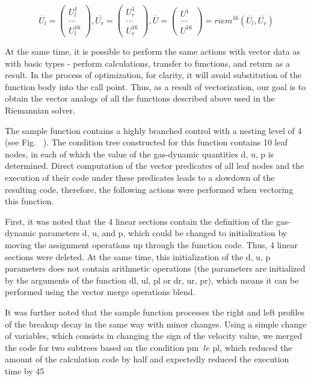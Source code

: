 \documentclass[
11pt,%
tightenlines,%
twoside,%
onecolumn,%
nofloats,%
nobibnotes,%
nofootinbib,%
superscriptaddress,%
noshowpacs,%
centertags]%
{revtex4}
\begin{document}
\begin{equation}\label{eq:riemann_16}
\overline{U_l} = \left( \begin{array}{ccc} U_l^1 \\ ... \\ U_l^{16} \end{array} \right),
\overline{U_r} = \left( \begin{array}{ccc} U_r^1 \\ ... \\ U_r^{16} \end{array} \right),
\overline{U} = \left( \begin{array}{ccc} U^1 \\ ... \\ U^{16} \end{array} \right) = riem^{16}(\overline{U_l}, \overline{U_r})
\end{equation}

At the same time, it is possible to perform the same actions with vector data as with basic types - perform calculations, transfer to functions, and return as a result. In the process of optimization, for clarity, it will avoid substitution of the function body into the call point. Thus, as a result of vectorization, our goal is to obtain the vector analogs of all the functions described above used in the Riemannian solver.

The sample function contains a highly branched control with a nesting level of 4 (see Fig. ~). The condition tree constructed for this function contains 10 leaf nodes, in each of which the value of the gas-dynamic quantities d, u, p is determined. Direct computation of the vector predicates of all leaf nodes and the execution of their code under these predicates leads to a slowdown of the resulting code, therefore, the following actions were performed when vectoring this function.

First, it was noted that the 4 linear sections contain the definition of the gas-dynamic parameters d, u, and p, which could be changed to initialization by moving the assignment operations up through the function code. Thus, 4 linear sections were deleted. At the same time, this initialization of the d, u, p parameters does not contain arithmetic operations (the parameters are initialized by the arguments of the function dl, ul, pl or dr, ur, pr), which means it can be performed using the vector merge operations blend.

It was further noted that the sample function processes the right and left profiles of the breakup decay in the same way with minor changes. Using a simple change of variables, which consists in changing the sign of the velocity value, we merged the code for two subtrees based on the condition pm $ \ le $ pl, which reduced the amount of the calculation code by half and expectedly reduced the execution time by 45%
\end{document}
